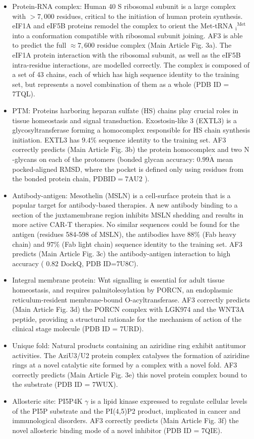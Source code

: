 \documentclass[10pt]{article}
\def\AA{\mathring{\mathrm{A}}}
\begin{document}
\begin{itemize}
  \item Protein-RNA complex: Human 40 S ribosomal subunit is a large complex with $>7,000$ residues, critical to the initiation of human protein synthesis. eIF1A and eIF5B proteins remodel the complex to orient the Met-tRNA ${ }_{\mathrm{i}}{ }^{\text {Met }}$ into a conformation compatible with ribosomal subunit joining. AF3 is able to predict the full $\approx 7,600$ residue complex (Main Article Fig. 3a). The eIF1A protein interaction with the ribosomal subunit, as well as the eIF5B intra-residue interactions, are modelled correctly. The complex is composed of a set of 43 chains, each of which has high sequence identity to the training set, but represents a novel combination of them as a whole (PDB ID = 7TQL).
  \item PTM: Proteins harboring heparan sulfate (HS) chains play crucial roles in tissue homeostasis and signal transduction. Exostosin-like 3 (EXTL3) is a glycosyltransferase forming a homocomplex responsible for HS chain synthesis initiation. EXTL3 has $9.4 \%$ sequence identity to the training set. AF3 correctly predicts (Main Article Fig. 3b) the protein homocomplex and two N -glycans on each of the protomers (bonded glycan accuracy: $0.99 \AA$ mean pocked-aligned RMSD, where the pocket is defined only using residues from the bonded protein chain, $\mathrm{PDB} \mathrm{ID}=7 \mathrm{AU} 2$ ).
  \item Antibody-antigen: Mesothelin (MSLN) is a cell-surface protein that is a popular target for antibody-based therapies. A new antibody binding to a section of the juxtamembrane region inhibits MSLN shedding and results in more active CAR-T therapies. No similar sequences could be found for the antigen (residues 584-598 of MSLN), the antibodies have $88 \%$ (Fab heavy chain) and $97 \%$ (Fab light chain) sequence identity to the training set. AF3 predicts (Main Article Fig. 3c) the antibody-antigen interaction to high accuracy ( 0.82 DockQ, PDB ID=7U8C).
  \item Integral membrane protein: Wnt signalling is essential for adult tissue homeostasis, and requires palmitoleoylation by PORCN, an endoplasmic reticulum-resident membrane-bound O-acyltransferase. AF3 correctly predicts (Main Article Fig. 3d) the PORCN complex with LGK974 and the WNT3A peptide, providing a structural rationale for the mechanism of action of the clinical stage molecule (PDB ID = 7URD).
  \item Unique fold: Natural products containing an aziridine ring exhibit antitumor activities. The AziU3/U2 protein complex catalyses the formation of aziridine rings at a novel catalytic site formed by a complex with a novel fold. AF3 correctly predicts (Main Article Fig. 3e) this novel protein complex bound to the substrate (PDB ID = 7WUX).
  \item Allosteric site: PI5P4K $\gamma$ is a lipid kinase expressed to regulate cellular levels of the PI5P substrate and the PI(4,5)P2 product, implicated in cancer and immunological disorders. AF3 correctly predicts (Main Article Fig. 3f) the novel allosteric binding mode of a novel inhibitor (PDB ID = 7QIE).
\end{itemize}
\end{document}
